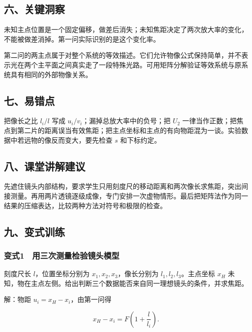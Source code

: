 \documentclass[12pt,a4paper,fontset=fandol]{ctexart}
\begin{document}
\subsection{六、关键洞察}\label{ux516dux5173ux952eux6d1eux5bdf}

未知主点位置是一个固定偏移，做差后消失；未知焦距决定了两次放大率的变化，不能被做差消掉。第一问实际识别的是这个变化率。

第二问的两主点属于对整个系统的等效描述。它们允许物像公式保持简单，并不表示光在两个主平面之间真实走了一段特殊光路。可用矩阵分解验证等效系统与原系统具有相同的外部物像关系。

\subsection{七、易错点}\label{ux4e03ux6613ux9519ux70b9}

把像长之比 \(l_i/l\) 写成 \(u_i/v_i\)；漏掉总放大率中的负号；把 \(U_2\)
一律当作正数；把焦点到第二片的距离误当有效焦距；把主点坐标和主点的有向物距混为一谈。实验数据中若远物的像反而变大，要先检查
\(s\) 和下标约定。

\subsection{八、课堂讲解建议}\label{ux516bux8bfeux5802ux8bb2ux89e3ux5efaux8bae}

先遮住镜头内部结构，要求学生只用刻度尺的移动距离和两次像长求焦距，突出间接测量。再用两片透镜逐级成像，专门安排一次虚物情形。最后把矩阵法作为同一结果的压缩表达，比较两种方法对符号和极限的检查。

\subsection{九、变式训练}\label{ux4e5dux53d8ux5f0fux8badux7ec3}

\subsubsection{变式1　用三次测量检验镜头模型}\label{ux53d8ux5f0f1-ux7528ux4e09ux6b21ux6d4bux91cfux68c0ux9a8cux955cux5934ux6a21ux578b}

刻度尺长 \(l\)，位置坐标分别为 \(x_1,x_2,x_3\)，像长分别为
\(l_1,l_2,l_3\)。主点坐标 \(x_H\)
未知，物在主点左侧。给出判断三个数据能否来自同一理想镜头的条件，并求焦距。

解：物距 \(u_i=x_H-x_i\)，由第一问得

\[x_H-x_i=F\left(1+\frac l{l_i}\right).\]
\end{document}
